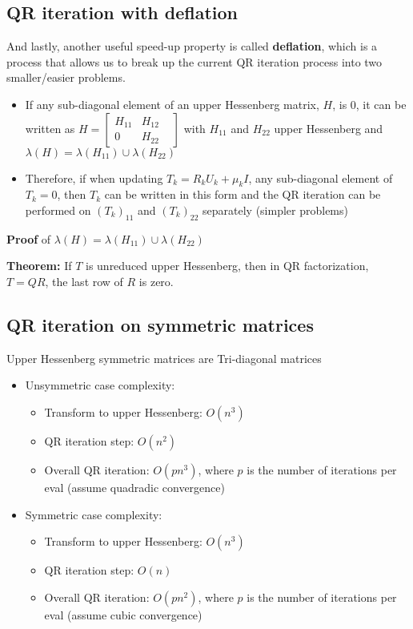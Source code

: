 \documentclass{article}
\begin{document}
\subsection{QR iteration with deflation}
And lastly, another useful speed-up property is called \textbf{deflation}, which is a process that allows us to break up the current QR iteration process into two smaller/easier problems.
\begin{itemize}
    \item If any sub-diagonal element of an upper Hessenberg matrix, $H$, is 0, it can be written as $H = \begin{bmatrix} H_{11} & H_{12} \\ 0 & H_{22} &\end{bmatrix}$ with $H_{11}$ and $H_{22}$ upper Hessenberg and $\lambda(H) = \lambda(H_{11})\cup \lambda(H_{22})$
    \item Therefore, if when updating $T_k = R_kU_k + \mu_k I$, any sub-diagonal element of $T_k = 0$, then $T_k$ can be written in this form and the QR iteration can be performed on $(T_k)_{11}$ and $(T_k)_{22}$ separately (simpler  problems)
\end{itemize}
\textbf{Proof} of $\lambda(H) = \lambda(H_{11})\cup \lambda(H_{22})$

\textbf{Theorem:} If $T$ is unreduced upper Hessenberg, then in QR factorization, $T=QR$, the last row of $R$ is zero.

\subsection{QR iteration on symmetric matrices}
Upper Hessenberg symmetric matrices are Tri-diagonal matrices
\begin{itemize}
    \item Unsymmetric case complexity:
    \begin{itemize}
        \item Transform to upper Hessenberg: $O(n^3)$
        \item QR iteration step: $O(n^2)$
        \item Overall QR iteration: $O(pn^3)$, where $p$ is the number of iterations per eval (assume quadradic convergence)
    \end{itemize}
    \item Symmetric case complexity:
    \begin{itemize}
        \item Transform to upper Hessenberg: $O(n^3)$
        \item QR iteration step: $O(n)$
        \item Overall QR iteration: $O(pn^2)$, where $p$ is the number of iterations per eval (assume cubic convergence) 
    \end{itemize}
\end{itemize}
\end{document}
